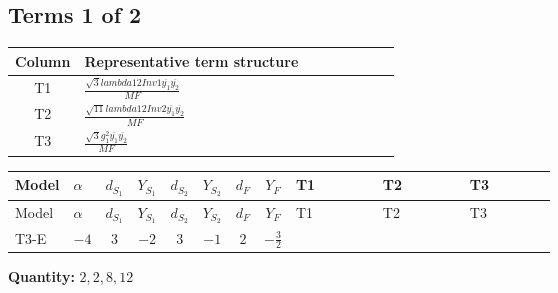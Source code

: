 \documentclass[8pt]{article}
\begin{document}
\begin{landscape}
\subsection*{Terms 1 of 2}
\begin{center}
\begin{tabular}{@{}c >{\raggedright\arraybackslash}p{0.82\linewidth}@{}}
\toprule
Column & Representative term structure \\
\midrule
T1 & \(\displaystyle \frac{\sqrt{3} lambda12Inv1 \overline{y_{1}} \overline{y_{2}}}{MF}\) \\
\midrule
T2 & \(\displaystyle \frac{\sqrt{11} lambda12Inv2 \overline{y_{1}} \overline{y_{2}}}{MF}\) \\
\midrule
T3 & \(\displaystyle \frac{\sqrt{3} g_{1}^{2} \overline{y_{1}} \overline{y_{2}}}{MF}\) \\
\midrule
\bottomrule
\end{tabular}
\end{center}
\smallskip
\tiny
\begin{longtable}{@{}llcccccc >{\raggedright\arraybackslash}p{0.21\linewidth} >{\raggedright\arraybackslash}p{0.21\linewidth} >{\raggedright\arraybackslash}p{0.21\linewidth}@{}}
\toprule
Model & $\alpha$ & $d_{S_1}$ & $Y_{S_1}$ & $d_{S_2}$ & $Y_{S_2}$ & $d_F$ & $Y_F$ & T1 & T2 & T3 \\
\midrule
\endfirsthead
\toprule
Model & $\alpha$ & $d_{S_1}$ & $Y_{S_1}$ & $d_{S_2}$ & $Y_{S_2}$ & $d_F$ & $Y_F$ & T1 & T2 & T3 \\
\midrule
\endhead
T3-E & $-4$ & $3$ & $-2$ & $3$ & $-1$ & $2$ & $-\frac{3}{2}$ & \scriptsize\adjustbox{max width=\linewidth}{$\begin{gathered} - \frac{\sqrt{3} lambda12Inv1 \overline{y_{1}} \overline{y_{2}}}{6 MF}\end{gathered}$} & \scriptsize\adjustbox{max width=\linewidth}{$\begin{gathered} \frac{3 \sqrt{11} lambda12Inv2 \overline{y_{1}} \overline{y_{2}}}{22 MF}\end{gathered}$} & \scriptsize\adjustbox{max width=\linewidth}{$\begin{gathered} \frac{9 \sqrt{3} g_{1}^{2} \overline{y_{1}} \overline{y_{2}}}{8 MF}\end{gathered}$} \\
\midrule
\bottomrule
\end{longtable}
\clearpage
\noindent\textbf{Quantity: }$\mathrm{2,2,8,12}$\par\smallskip

\end{landscape}
\end{document}
